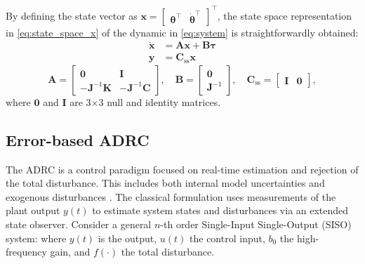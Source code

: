     By defining the state vector as
    $\mathbf{x} = 
    \begin{bmatrix} 
        \bm{\theta}^\top & 
        \dot{\bm{\theta}}^\top
    \end{bmatrix}^\top$,
    the state space representation in 
    \eqref{eq:state_space_x} of the dynamic in \eqref{eq:system} is straightforwardly obtained:
    \begin{align}
        \dot{\mathbf{x}} 
        &=
        \mathbf{A}\mathbf{x} + \mathbf{B}\bm{\tau} 
    \label{eq:state_space_x}
        \\
        \mathbf{y} 
        &= 
        \mathbf{C}_\text{ss}
        \mathbf{x} 
    \label{eq:state_space_y}
    \end{align}
    \begin{equation*}
        \mathbf{A} =
        \begin{bmatrix}
            \mathbf{0} & \mathbf{I} \\
            -\mathbf{J}^{-1}\mathbf{K} & -\mathbf{J}^{-1}\mathbf{C}
        \end{bmatrix},
        \quad
        \mathbf{B} =
        \begin{bmatrix}
            \mathbf{0} \\
            \mathbf{J}^{-1}
        \end{bmatrix},
        \quad
        \mathbf{C}_\text{ss} = 
        \begin{bmatrix}
            \mathbf{I} &
            \mathbf{0}
        \end{bmatrix},
    \end{equation*}
    where $\mathbf{0}$ and $\mathbf{I}$ are 3$\times$3 null and identity matrices.
    
    \subsection{Error-based ADRC}
    \label{sec:adrc}
    
    The ADRC is a control paradigm focused on real-time estimation and rejection of the total disturbance. This includes both internal model uncertainties and exogenous disturbances \citep{Guo:2016}. The classical formulation uses measurements of the plant output $y(t)$ to estimate system states and disturbances via an extended state observer. Consider a general $n$-th order Single-Input Single-Output (SISO) system:
    where $y(t)$ is the output, $u(t)$ the control input, $b_0$ the high-frequency gain, and $f(\cdot)$ the total disturbance.
    
